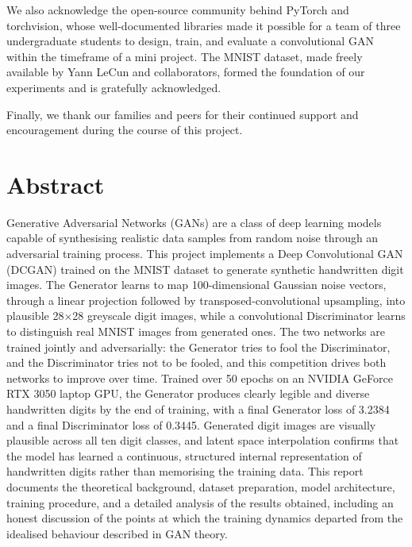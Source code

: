 \documentclass[12pt,a4paper]{article}
\begin{document}
We also acknowledge the open-source community behind PyTorch and torchvision, whose
well-documented libraries made it possible for a team of three undergraduate students
to design, train, and evaluate a convolutional GAN within the timeframe of a mini
project. The MNIST dataset, made freely available by Yann LeCun and collaborators,
formed the foundation of our experiments and is gratefully acknowledged.

Finally, we thank our families and peers for their continued support and encouragement
during the course of this project.

\newpage

\section*{Abstract}

Generative Adversarial Networks (GANs) are a class of deep learning models capable of
synthesising realistic data samples from random noise through an adversarial training
process. This project implements a Deep Convolutional GAN (DCGAN) trained on the MNIST
dataset to generate synthetic handwritten digit images. The Generator learns to map
100-dimensional Gaussian noise vectors, through a linear projection followed by
transposed-convolutional upsampling, into plausible 28$\times$28 greyscale digit images,
while a convolutional Discriminator learns to distinguish real MNIST images from
generated ones. The two networks are trained jointly and adversarially: the Generator
tries to fool the Discriminator, and the Discriminator tries not to be fooled, and this
competition drives both networks to improve over time. Trained over 50 epochs on an
NVIDIA GeForce RTX 3050 laptop GPU, the Generator produces clearly legible and diverse
handwritten digits by the end of training, with a final Generator loss of 3.2384 and a
final Discriminator loss of 0.3445. Generated digit images are visually plausible across
all ten digit classes, and latent space interpolation confirms that the model has learned
a continuous, structured internal representation of handwritten digits rather than
memorising the training data. This report documents the theoretical background, dataset
preparation, model architecture, training procedure, and a detailed analysis of the
results obtained, including an honest discussion of the points at which the training
dynamics departed from the idealised behaviour described in GAN theory.
\end{document}
